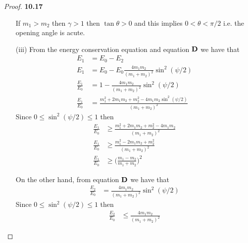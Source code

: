 \documentclass[11pt]{article}
\theoremstyle{definition}
\begin{document}
\begin{proof}{\textbf{10.17}}
\begin{itemize}
        If $m_1 > m_2$ then $\gamma > 1$ then $\tan\theta > 0$ and this
        implies $0 < \theta < \pi/2$ i.e. the opening angle is acute.
        
        \item[(iii)] From the energy conservation equation and equation $\bf{D}$
        we have that
        \begin{align*}
            E_1 &= E_0 - E_2\\
            E_1 &= E_0 - E_0 \frac{4m_1m_2}{(m_1 + m_2)^2} \sin^2(\psi/2)\\
            \frac{E_1}{E_0} &= 1 - \frac{4m_1m_2}{(m_1 + m_2)^2} \sin^2(\psi/2)\\
            \frac{E_1}{E_0} &= \frac{m_1^2 +2m_1m_2 + m_2^2 - 4m_1m_2\sin^2(\psi/2)}{(m_1 + m_2)^2}
        \end{align*}
        Since $0 \leq \sin^2(\psi/2) \leq 1$ then 
        \begin{align*}
            \frac{E_1}{E_0} &\geq \frac{m_1^2 +2m_1m_2 + m_2^2 - 4m_1m_2}{(m_1 + m_2)^2}\\
            \frac{E_1}{E_0} &\geq \frac{m_1^2 -2m_1m_2 + m_2^2}{(m_1 + m_2)^2}\\
            \frac{E_1}{E_0} &\geq \bigg(\frac{m_1 - m_2}{m_1 + m_2}\bigg)^2
        \end{align*}
        
        On the other hand, from equation $\bf{D}$ we have that
        \begin{align*}
            \frac{E_2}{E_0} &= \frac{4m_1m_2}{(m_1 + m_2)^2} \sin^2(\psi/2)
        \end{align*}
        Since $0 \leq \sin^2(\psi/2) \leq 1$ then 
        \begin{align*}
            \frac{E_2}{E_0} &\leq \frac{4m_1m_2}{(m_1 + m_2)^2}
        \end{align*}

    \end{itemize}
    \end{proof}
\cleardoublepage
\end{document}
